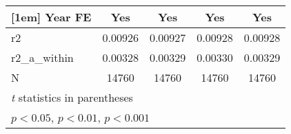 {\begin{tabular}{l*{4}{c}}
[1em]
Year FE     &         Yes         &         Yes         &         Yes         &         Yes         \\
\hline
r2          &     0.00926         &     0.00927         &     0.00928         &     0.00928         \\
r2\_a\_within &     0.00328         &     0.00329         &     0.00330         &     0.00329         \\
N           &       14760         &       14760         &       14760         &       14760         \\
\hline\hline
\multicolumn{5}{l}{\footnotesize \textit{t} statistics in parentheses}\\
\multicolumn{5}{l}{\footnotesize \sym{*} \(p<0.05\), \sym{**} \(p<0.01\), \sym{***} \(p<0.001\)}\\
\end{tabular}
}
